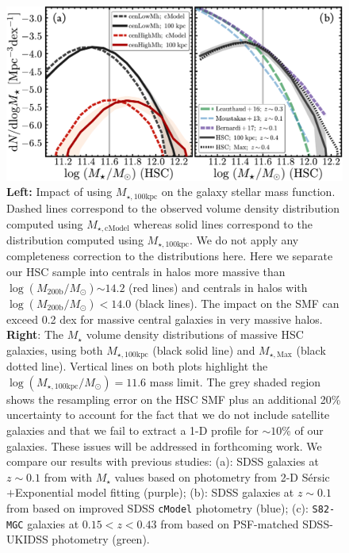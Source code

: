 \documentclass[a4paper,fleqn,usenatbib]{mnras}
\def\ser{{S\'{e}rsic\ }}
\def\mstar{{$M_{\star}$}}
\def\logmh{{$\log (M_{\mathrm{200b}}/M_{\odot})$}}
\def\mtot{{$M_{\star,100\mathrm{kpc}}$}}
\def\mmax{{$M_{\star,\mathrm{Max}}$}}
\def\mcmodel{{$M_{\star,\mathrm{cModel}}$}}
\def\logmtot{{$\log (M_{\star,100\mathrm{kpc}}/M_{\odot})$}}
\begin{document}
  \begin{figure}
      \centering 
      \includegraphics[width=\textwidth]{fig/redbcg_mass_smf}
      \caption{
          \textbf{Left:} Impact of using \mtot{} on the galaxy stellar mass function. 
          Dashed lines correspond to the observed volume density distribution 
          computed using \mcmodel{} whereas solid lines correspond to the distribution
          computed using \mtot{}. 
          We do not apply any completeness correction to the distributions here.
          Here we separate our HSC sample into centrals in halos more massive than
          \logmh{}$\sim14.2$ (red lines) and centrals in halos with \logmh{}$<14.0$ 
          (black lines).
          The impact on the SMF can exceed 0.2 dex for massive central galaxies in 
          very massive halos.
          \textbf{Right}: The \mstar{} volume density distributions of massive 
          HSC galaxies, using both \mtot{} (black solid line) and \mmax{} (black dotted 
          line).  
          Vertical lines on both plots highlight the \logmtot{}$=11.6$ mass limit. 
          The grey shaded region shows the resampling error on the HSC SMF plus an
          additional 20\% uncertainty to account for the fact that we do not include 
          satellite galaxies and that we fail to extract a 1-D profile for $\sim 10$\% 
          of our galaxies. 
          These issues will be addressed in forthcoming work. 
          We compare our results with previous studies: 
          (a): SDSS galaxies at $z{\sim} 0.1$ from \citet{Bernardi2017} with \mstar{} 
          values based on photometry from 2-D \ser{}$+$Exponential model fitting 
          (purple); 
          (b): SDSS galaxies at $z{\sim} 0.1$ from \citet{Moustakas13} based on 
          improved SDSS \texttt{cModel} photometry (blue); 
          (c): \texttt{S82-MGC} galaxies at $0.15 < z< 0.43$ from 
          \citet{Leauthaud2016} based on PSF-matched SDSS-UKIDSS photometry (green).
          }
      \label{fig:smf}
  \end{figure}
\end{document}
